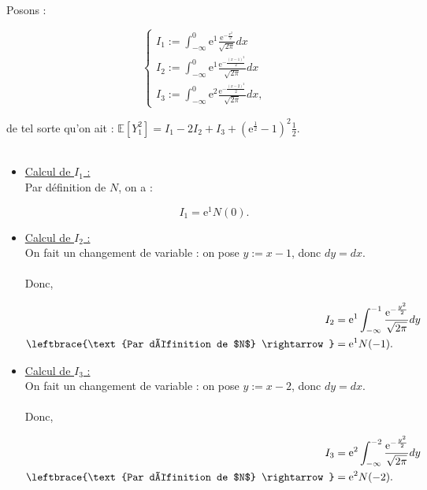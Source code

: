 \documentclass{article}
\theoremstyle{exostyle}
\newenvironment{questions}{
\begin{enumerate}[\hspace{12pt} 1.]}{\end{enumerate}}
\begin{document}
\begin{questions}
Posons : 

\[\left\{
  \begin{array}{lll}
    I_{1} := \int_{-\infty}^{0} \text{e}^{1} \frac{\text{e}^{-\frac{x^{2}}{2}}}{\sqrt{2\pi}}dx\\
    I_{2} := \int_{-\infty}^{0} \text{e}^{1} \frac{\text{e}^{-\frac{(x-1)^{2}}{2}}}{\sqrt{2\pi}}dx\\
    I_{3} := \int_{-\infty}^{0} \text{e}^{2} \frac{ \text{e}^{-\frac{(x-2)^{2}}{2}}}{\sqrt{2\pi}}dx,
\end{array}
\right.\]

de tel sorte qu'on ait : $\mathbb{E}\left[ Y_{1}^{2} \right] = I_{1}-2I_{2}+I_{3} + \left( \text{e}^{\frac{1}{2}} - 1 \right)^{2} \frac{1}{2}$.\\
\\
\begin{itemize}
    \item \underline{Calcul de $I_{1}$ :}\\
    
    Par définition de $N$, on a : 

\[I_{1} = \text{e}^{1}N(0).\]

\item \underline{Calcul de $I_{2}$ :}\\

On fait un changement de variable : on pose $y:=x-1$, donc $dy=dx$.\\
    \\
Donc, 

\begin{align*}
    I_{2} &= \text{e}^{1} \int_{-\infty}^{-1} \frac{\text{e}^{-\frac{y^{2}}{2}}}{\sqrt{2\pi}}dy\\
    \leftbrace{\text{Par définition de $N$} \rightarrow} &= \text{e}^{1}N(-1).
\end{align*}

\item \underline{Calcul de $I_{3}$ :}\\

On fait un changement de variable : on pose $y:=x-2$, donc $dy=dx$.\\
    \\
Donc, 

\begin{align*}
    I_{3} &= \text{e}^{2} \int_{-\infty}^{-2} \frac{\text{e}^{-\frac{y^{2}}{2}}}{\sqrt{2\pi}}dy\\
    \leftbrace{\text{Par définition de $N$} \rightarrow} &= \text{e}^{2}N(-2).
\end{align*}
\end{itemize}


\end{questions}
\end{document}
